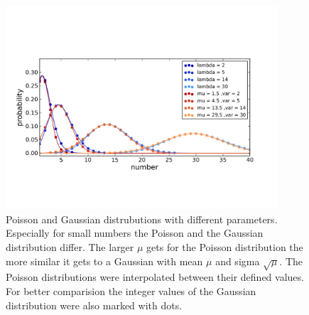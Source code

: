 \begin{figure}
\centering
\includegraphics[width = 0.9\textwidth]{pictures/poissgaussdistr.png}
	\caption{Poisson and Gaussian distrubutions with different parameters. Especially for small numbers the Poisson and the Gaussian distribution differ. The larger $\mu$ gets for the Poisson distribution the more similar it gets to a Gaussian with mean $\mu$ and sigma $\sqrt{\mu}$. The Poisson distributions were interpolated between their defined values. For better comparision the integer values of the Gaussian distribution were also marked with dots.}
	\label{poisgaussdistr}
\end{figure}

